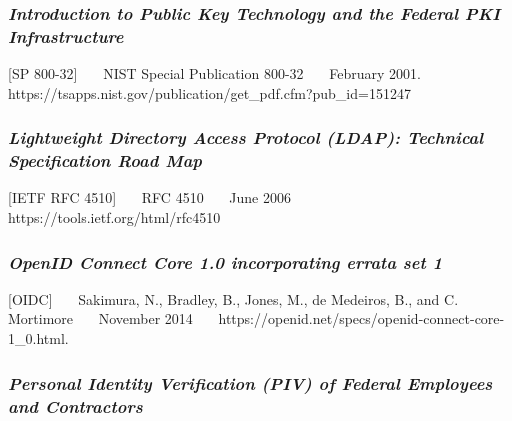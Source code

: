 \hypertarget{introduction-to-public-key-technology-and-the-federal-pki-infrastructure}{%
\subsubsection{\texorpdfstring{\emph{Introduction to Public Key Technology
and the Federal PKI
Infrastructure}}{Introduction to Public Key Technology and the Federal PKI Infrastructure}}\label{introduction-to-public-key-technology-and-the-federal-pki-infrastructure}}

{[}SP 800-32{]}~~~ NIST Special Publication 800-32~~~ February 2001.~~~
https://tsapps.nist.gov/publication/get\_pdf.cfm?pub\_id=151247~~~

\hypertarget{lightweight-directory-access-protocol-ldap-technical-specification-road-map}{%
\subsubsection{\texorpdfstring{\emph{Lightweight Directory Access Protocol
(LDAP): Technical Specification Road
Map}}{Lightweight Directory Access Protocol (LDAP): Technical Specification Road Map}}\label{lightweight-directory-access-protocol-ldap-technical-specification-road-map}}

{[}IETF RFC 4510{]}~~~ RFC 4510~~~ June 2006~~~
https://tools.ietf.org/html/rfc4510~~~

\hypertarget{openid-connect-core-1.0-incorporating-errata-set-1}{%
\subsubsection{\texorpdfstring{\emph{OpenID Connect Core 1.0 incorporating
errata set
1}}{OpenID Connect Core 1.0 incorporating errata set 1}}\label{openid-connect-core-1.0-incorporating-errata-set-1}}

{[}OIDC{]}~~~ Sakimura, N., Bradley, B., Jones, M., de Medeiros, B., and
C. Mortimore~~~ November 2014~~~
https://openid.net/specs/openid-connect-core-1\_0.html.~~~

\hypertarget{personal-identity-verification-piv-of-federal-employees-and-contractors}{%
\subsubsection{\texorpdfstring{\emph{Personal Identity Verification (PIV) of
Federal Employees and
Contractors}}{Personal Identity Verification (PIV) of Federal Employees and Contractors}}\label{personal-identity-verification-piv-of-federal-employees-and-contractors}}

